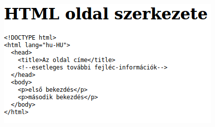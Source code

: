 \begin{frame}
  \begin{columns}[c]
  \begin{exampleblock}{}
    \scriptsize
    
  \end{exampleblock}
      \includegraphics[width=\textwidth]{entitas.png}
  \end{columns}

\end{frame}
